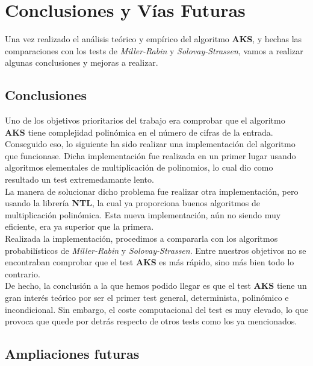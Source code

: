 \chapter{Conclusiones y Vías Futuras}

Una vez realizado el análisis teórico y empírico del algoritmo \textbf{AKS}, y hechas las comparaciones con los tests de \textit{Miller-Rabin} y \textit{Solovay-Strassen}, vamos a realizar algunas conclusiones y mejoras a realizar.

\section{Conclusiones}

Uno de los objetivos prioritarios del trabajo era comprobar que el algoritmo \textbf{AKS} tiene complejidad polinómica en el número de cifras de la entrada.\\

Conseguido eso, lo siguiente ha sido realizar una implementación del algoritmo que funcionase. Dicha implementación fue realizada en un primer lugar usando algoritmos elementales de multiplicación de polinomios, lo cual dio como resultado un test extremedamante lento.\\

La manera de solucionar dicho problema fue realizar otra implementación, pero usando la librería \textbf{NTL}, la cual ya proporciona buenos algoritmos de multiplicación polinómica. Esta nueva implementación, aún no siendo muy eficiente, era ya superior que la primera.\\

Realizada la implementación, procedimos a compararla con los algoritmos probabilísticos de \textit{Miller-Rabin} y \textit{Solovay-Strassen}. Entre nuestros objetivos no se encontraban comprobar que el test \textbf{AKS} es más rápido, sino más bien todo lo contrario.\\

De hecho, la conclusión a la que hemos podido llegar es que el test \textbf{AKS} tiene un gran interés teórico por ser el primer test general, determinista, polinómico e incondicional. Sin embargo, el coste computacional del test es muy elevado, lo que provoca que quede por detrás respecto de otros tests como los ya mencionados.

\section{Ampliaciones futuras}

